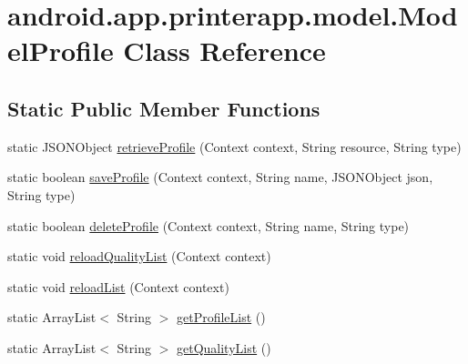 \hypertarget{classandroid_1_1app_1_1printerapp_1_1model_1_1_model_profile}{}\section{android.\+app.\+printerapp.\+model.\+Model\+Profile Class Reference}
\label{classandroid_1_1app_1_1printerapp_1_1model_1_1_model_profile}
\subsection*{Static Public Member Functions}
\begin{DoxyCompactItemize}
\item 
static J\+S\+O\+N\+Object \hyperlink{classandroid_1_1app_1_1printerapp_1_1model_1_1_model_profile_ae6a0b5f13369a7dbe7b6bbd53b1a3040}{retrieve\+Profile} (Context context, String resource, String type)
\item 
static boolean \hyperlink{classandroid_1_1app_1_1printerapp_1_1model_1_1_model_profile_a312c4f716ea01256e7c50e49f6f93704}{save\+Profile} (Context context, String name, J\+S\+O\+N\+Object json, String type)
\item 
static boolean \hyperlink{classandroid_1_1app_1_1printerapp_1_1model_1_1_model_profile_a4ece09ebf30caa0bf062c94e3dd37e82}{delete\+Profile} (Context context, String name, String type)
\item 
static void \hyperlink{classandroid_1_1app_1_1printerapp_1_1model_1_1_model_profile_a4e507019d2f8861671378735218977bb}{reload\+Quality\+List} (Context context)
\item 
static void \hyperlink{classandroid_1_1app_1_1printerapp_1_1model_1_1_model_profile_a74238913c96984d1ff67e6d7adc067fa}{reload\+List} (Context context)
\item 
static Array\+List$<$ String $>$ \hyperlink{classandroid_1_1app_1_1printerapp_1_1model_1_1_model_profile_a9d603d596cdab25fa0c2071ad251daf8}{get\+Profile\+List} ()
\item 
static Array\+List$<$ String $>$ \hyperlink{classandroid_1_1app_1_1printerapp_1_1model_1_1_model_profile_a6b03288728bff1ffbbf923b8c306f041}{get\+Quality\+List} ()
\end{DoxyCompactItemize}
